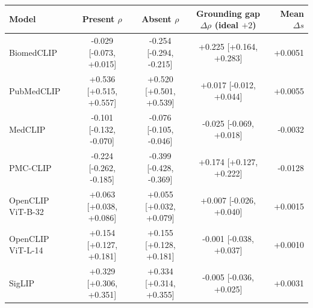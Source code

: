 \begin{tabular}{lcccr}
\toprule
Model & Present $\rho$ & Absent $\rho$ & Grounding gap $\Delta\rho$ (ideal $+2$) & Mean $\Delta s$ \\
\midrule
BiomedCLIP & -0.029 [-0.073, +0.015] & -0.254 [-0.294, -0.215] & +0.225 [+0.164, +0.283] & +0.0051 \\
PubMedCLIP & +0.536 [+0.515, +0.557] & +0.520 [+0.501, +0.539] & +0.017 [-0.012, +0.044] & +0.0055 \\
MedCLIP & -0.101 [-0.132, -0.070] & -0.076 [-0.105, -0.046] & -0.025 [-0.069, +0.018] & -0.0032 \\
PMC-CLIP & -0.224 [-0.262, -0.185] & -0.399 [-0.428, -0.369] & +0.174 [+0.127, +0.222] & -0.0128 \\
OpenCLIP ViT-B-32 & +0.063 [+0.038, +0.086] & +0.055 [+0.032, +0.079] & +0.007 [-0.026, +0.040] & +0.0015 \\
OpenCLIP ViT-L-14 & +0.154 [+0.127, +0.181] & +0.155 [+0.128, +0.181] & -0.001 [-0.038, +0.037] & +0.0010 \\
SigLIP & +0.329 [+0.306, +0.351] & +0.334 [+0.314, +0.355] & -0.005 [-0.036, +0.025] & +0.0031 \\
\bottomrule
\end{tabular}
